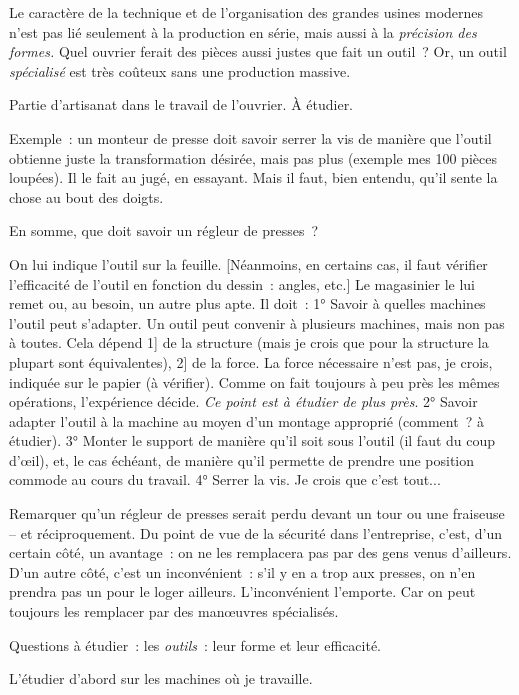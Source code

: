 \documentclass[french,twoside]{book} %
\begin{document}
Le caractère de la technique et de l'organisation des grandes usines modernes n'est pas lié seulement à la production en série, mais aussi à la {\itshape précision des formes.} Quel ouvrier ferait des pièces aussi justes que fait un outil ? Or, un outil {\itshape spécialisé} est très coûteux sans une production massive.\par
Partie d'artisanat dans le travail de l'ouvrier. À étudier.\par
Exemple : un monteur de presse doit savoir serrer la vis de manière que l'outil obtienne juste la transformation désirée, mais pas plus (exemple mes 100 pièces loupées). Il le fait au jugé, en essayant. Mais il faut, bien entendu, qu'il sente la chose au bout des doigts.\par
En somme, que doit savoir un régleur de presses ?\par
On lui indique l'outil sur la feuille. [Néanmoins, en certains cas, il faut vérifier l'efficacité de l'outil en fonction du dessin : angles, etc.] Le magasinier le lui remet ou, au besoin, un autre plus apte. Il doit : 1° Savoir à quelles machines l'outil peut s'adapter. Un outil peut convenir à plusieurs machines, mais non pas à toutes. Cela dépend 1] de la structure (mais je crois que pour la structure la plupart sont équivalentes), 2] de la force. La force nécessaire n'est pas, je crois, indiquée sur le papier (à vérifier). Comme on fait toujours à peu près les mêmes opérations, l'expérience décide. {\itshape Ce point est à étudier de plus près}. 2° Savoir adapter l'outil à la machine au moyen d'un montage approprié (comment ? à étudier). 3° Monter le support de manière qu'il soit sous l'outil (il faut du coup d'œil), et, le cas échéant, de manière qu'il permette de prendre une position commode au cours du travail. 4° Serrer la vis. Je crois que c'est tout...\par
Remarquer qu'un régleur de presses serait perdu devant un tour ou une fraiseuse – et réciproquement. Du point de vue de la sécurité dans l'entreprise, c'est, d'un certain côté, un avantage : on ne les remplacera pas par des gens venus d'ailleurs. D'un autre côté, c'est un inconvénient : s'il y en a trop aux presses, on n'en prendra pas un pour le loger ailleurs. L'inconvénient l'emporte. Car on peut toujours les remplacer par des manœuvres spécialisés.\par
Questions à étudier : les {\itshape outils} : leur forme et leur efficacité.\par
L'étudier d'abord sur les machines où je travaille.\par
\end{document}
